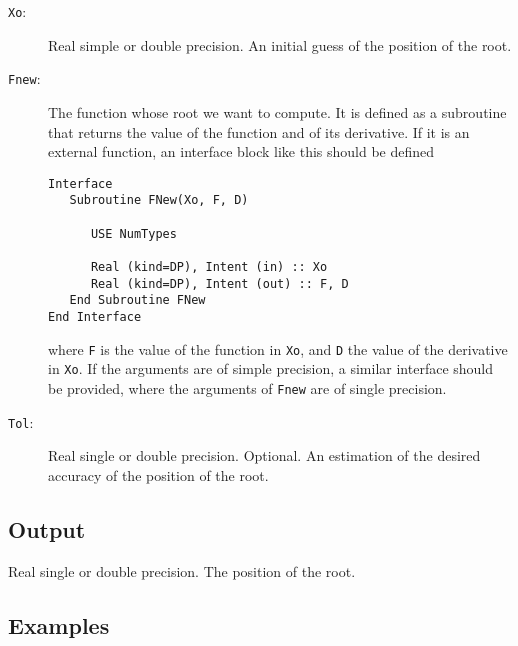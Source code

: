 \begin{description}
\item[\texttt{Xo}:] Real simple or double precision. An initial guess
  of the position of the root.
\item[\texttt{Fnew}:] The function whose root we want to compute. It
  is defined as a subroutine that returns the value of the function
  and of its derivative. If it is an external function, an interface
  block like this should be defined
\begin{verbatim}
Interface
   Subroutine FNew(Xo, F, D)

      USE NumTypes

      Real (kind=DP), Intent (in) :: Xo
      Real (kind=DP), Intent (out) :: F, D
   End Subroutine FNew
End Interface
\end{verbatim}
where \texttt{F} is the value of the function in \texttt{Xo}, and
\texttt{D} the value of the derivative in \texttt{Xo}. If the
arguments are of simple precision, a similar interface should be
provided, where the arguments of \texttt{Fnew} are of single
precision. 
\item[\texttt{Tol}:] Real single or double precision. Optional. An
  estimation of the desired accuracy of the  position of the root.
\end{description}

\subsection{Output}

Real single or double precision. The position of the root.


\subsection{Examples}

